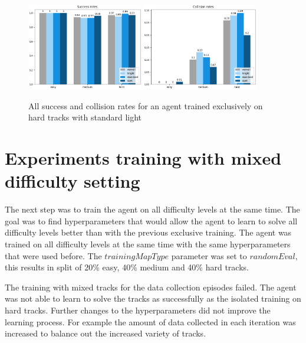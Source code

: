 \begin{figure}
    \centering
    \includegraphics[width=0.45\textwidth]{Bilder/notebook_images/hardDistanceStandardLight_eval_all_success_rates_barplot.png}
    \includegraphics[width=0.45\textwidth]{Bilder/notebook_images/hardDistanceStandardLight_eval_all_collision_rates_barplot.png}
    \caption{All success and collision rates for an agent trained exclusively on hard tracks with standard light}
    \label{fig:hardDistance_generalization_light_settings}
\end{figure}

\section{Experiments training with mixed difficulty setting}
\label{cha:experiment_mixed_difficulty}

The next step was to train the agent on all difficulty levels at the same time. The goal was to find hyperparameters that would allow the agent to learn to solve all difficulty levels better than with the previous exclusive training. The agent was trained on all difficulty levels at the same time with the same hyperparameters that were used before. The $trainingMapType$ parameter was set to $randomEval$, this results in split of 20\% easy, 40\% medium and 40\% hard tracks.

The training with mixed tracks for the data collection episodes failed. The agent was not able to learn to solve the tracks as successfully as the isolated training on hard tracks. Further changes to the hyperparameters did not improve the learning process. For example the amount of data collected in each iteration was increased to balance out the increased variety of tracks.

